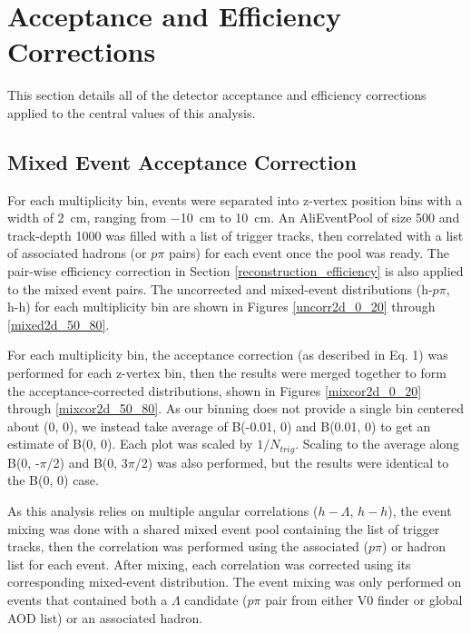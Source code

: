\documentclass[ALICE,manyauthors]{ALICE_analysis_notes}
\begin{document}
\clearpage

\section{Acceptance and Efficiency Corrections}
\label{efficiency_acceptance}
This section details all of the detector acceptance and efficiency corrections applied to the central values of this analysis.

\subsection{Mixed Event Acceptance Correction}
\label{mixed_event_correction}

For each multiplicity bin, events were separated into z-vertex position bins with a width of \SI{2}{cm}, ranging from \SI{-10}{cm} to \SI{10}{cm}. An AliEventPool of size 500 and track-depth 1000 was filled with a list of trigger tracks, then correlated with a list of associated hadrons (or $p\pi$ pairs) for each event once the pool was ready. The pair-wise efficiency correction in Section \ref{reconstruction_efficiency} is also applied to the mixed event pairs. The uncorrected and mixed-event distributions (h-$p\pi$, h-h) for each multiplicity bin are shown in Figures \ref{uncorr2d_0_20} through \ref{mixed2d_50_80}.

For each multiplicity bin, the acceptance correction (as described in Eq. 1) was performed for each z-vertex bin, then the results were merged together to form the acceptance-corrected distributions, shown in Figures \ref{mixcor2d_0_20} through \ref{mixcor2d_50_80}. As our binning does not provide a single bin centered about (0, 0), we instead take average of B(-0.01, 0) and B(0.01, 0) to get an estimate of B(0, 0). Each plot was scaled by $1/N_{trig}$. Scaling to the average along B(0, -$\pi$/2) and B(0, $3\pi$/2) was also performed, but the results were identical to the B(0, 0) case.

As this analysis relies on multiple angular correlations ($h-\Lambda$, $h-h$), the event mixing was done with a shared mixed event pool containing the list of trigger tracks, then the correlation was performed using the associated ($p\pi$) or hadron list for each event. After mixing, each correlation was corrected using its corresponding mixed-event distribution. The event mixing was only performed on events that contained both a $\Lambda$ candidate ($p\pi$ pair from either V0 finder or global AOD list) or an associated hadron.
\end{document}
